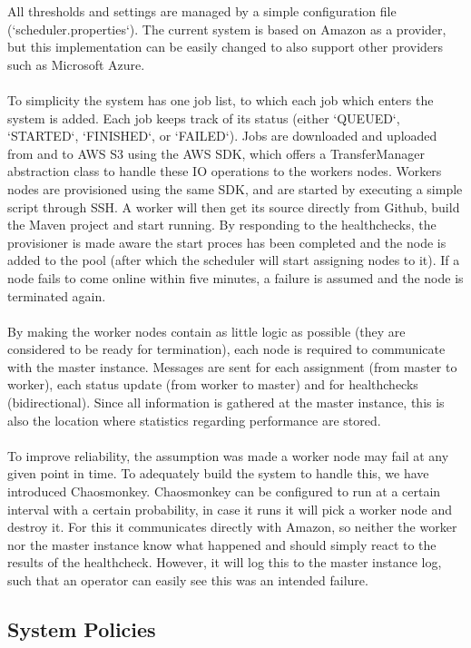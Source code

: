 \documentclass[a4paper]{IEEEtran}
\begin{document}
All thresholds and settings are managed by a simple configuration file (`scheduler.properties`).
The current system is based on Amazon as a provider, but this implementation can be easily changed to also support other providers such as Microsoft Azure.
\\
\\
To simplicity the system has one job list, to which each job which enters the system is added.
Each job keeps track of its status (either `QUEUED`, `STARTED`, `FINISHED`, or `FAILED`).
Jobs are downloaded and uploaded from and to AWS S3 using the AWS SDK, which offers a TransferManager abstraction class to handle these IO operations to the workers nodes.
Workers nodes are provisioned using the same SDK, and are started by executing a simple script through SSH.
A worker will then get its source directly from Github, build the Maven project and start running.
By responding to the healthchecks, the provisioner is made aware the start proces has been completed and the node is added to the pool (after which the scheduler will start assigning nodes to it).
If a node fails to come online within five minutes, a failure is assumed and the node is terminated again.
\\
\\
By making the worker nodes contain as little logic as possible (they are considered to be ready for termination), each node is required to communicate with the master instance.
Messages are sent for each assignment (from master to worker), each status update (from worker to master) and for healthchecks (bidirectional).
Since all information is gathered at the master instance, this is also the location where statistics regarding performance are stored.
\\
\\
To improve reliability, the assumption was made a worker node may fail at any given point in time.
To adequately build the system to handle this, we have introduced Chaosmonkey.
Chaosmonkey can be configured to run at a certain interval with a certain probability, in case it runs it will pick a worker node and destroy it.
For this it communicates directly with Amazon, so neither the worker nor the master instance know what happened and should simply react to the results of the healthcheck.
However, it will log this to the master instance log, such that an operator can easily see this was an intended failure.

\subsection{System Policies}
\end{document}
